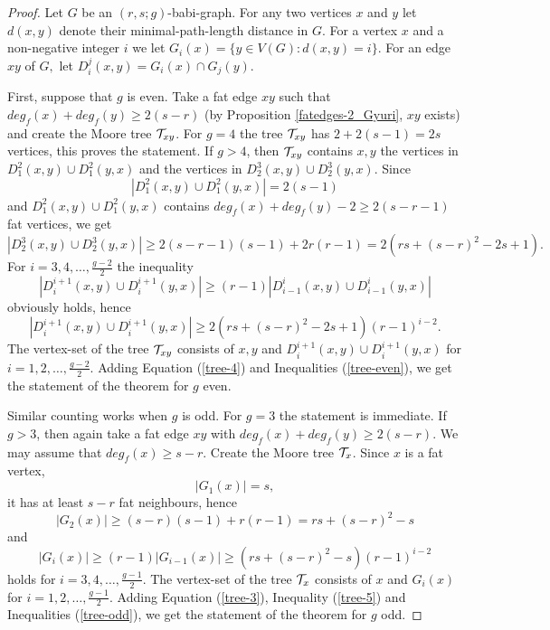 \documentclass[a4paper,11pt]{article}
\begin{document}
\begin{proof}
Let $G$ be an $(r,s;g)$-babi-graph. 
For any two vertices $x$ and $y$ let $d(x,y)$ denote their minimal-path-length distance in $G$. 
For a vertex $x$ and a non-negative integer $i$ we let $G_i(x) = \{y \in V(G) \colon d(x,y)=i\}$.  For an edge $xy$ of $G ,$ let $D_i^j(x,y)=G_i(x)\cap G_j(y).$ 

First, suppose that $g$ is even.
Take a fat edge $xy$ such that $deg_f(x)+deg_f(y)\geq 2(s-r)$ (by Proposition \ref{fatedges-2_Gyuri},
$xy$ exists) and create the Moore tree ${\cal{T}}_{xy}$. For $g=4$ the tree ${\cal{T}}_{xy}$ has 
$2+2(s-1)=2s$ vertices, this proves the statement. If $g>4$, then  ${\cal{T}}_{xy}$ contains $x,y$ the
vertices in $D_1^2(x,y)\cup D_1^2(y,x)$ and the vertices in $D_2^3(x,y)\cup D_2^3(y,x)$. Since
\begin{equation}
\label{tree-4}
|D_1^2(x,y)\cup D_1^2(y,x)| = 2(s-1)
\end{equation}
 and 
$D_1^2(x,y)\cup D_1^2(y,x)$ contains $deg_f(x)+deg_f(y)-2\geq 2(s-r-1)$ fat vertices, we get
$$|D_2^3(x,y)\cup D_2^3(y,x)|\geq   2(s-r-1)(s-1)+2r(r-1)=2(rs+(s-r)^2 -2s +1).$$
For $i=3,4,\dots ,\frac{g-2}{2}$ the inequality
\begin{equation}
\label{tree-estimate-even}
|D_i^{i+1}(x,y)\cup D_i^{i+1}(y,x)|\geq   (r-1)|D_{i-1}^{i}(x,y)\cup D_{i-1}^{i}(y,x)|
\end{equation}
obviously holds, hence
\begin{equation}
\label{tree-even}
|D_i^{i+1}(x,y)\cup D_i^{i+1}(y,x)|\geq   2(rs+(s-r)^2 -2s +1)(r-1)^{i-2}.
\end{equation}
The vertex-set of the tree ${\cal{T}}_{xy}$ consists of $x,y$ and  $D_i^{i+1}(x,y)\cup D_i^{i+1}(y,x)$ for
$i=1,2,\dots , \frac{g-2}{2}$. Adding Equation (\ref{tree-4}) and Inequalities (\ref{tree-even}), we get the statement of the theorem for $g$ even.

Similar counting works when $g$ is odd. For $g=3$ the statement is immediate. If $g>3$, then again
take a fat edge $xy$ with $deg_f(x)+deg_f(y)\geq 2(s-r)$. 
We may assume that $deg_f(x)\geq s-r$. Create the Moore tree ${\cal{T}}_{x}$. 
Since $x$ is a fat vertex, 
\begin{equation}
\label{tree-3}
|G_1(x)| =s,
\end{equation}
it has at least $s-r$ fat neighbours, hence
\begin{equation}
\label{tree-5}
|G_2(x)|\geq (s-r)(s-1)+r(r-1)=rs+(s-r)^2-s
\end{equation}
and
\begin{equation}
\label{tree-odd}
|G_i(x)|\geq (r-1)|G_{i-1}(x)|\geq (rs+(s-r)^2-s)(r-1)^{i-2}
\end{equation}
holds for $i=3,4,\dots , \frac{g-1}{2}$. 
The vertex-set of the tree ${\cal{T}}_{x}$ consists of $x$ and $G_i(x)$ for
$i=1,2,\dots , \frac{g-1}{2}$. Adding Equation (\ref{tree-3}), Inequality  (\ref{tree-5}) and Inequalities (\ref{tree-odd}), we get the statement of the theorem for $g$ odd.
\end{proof}
\end{document}
